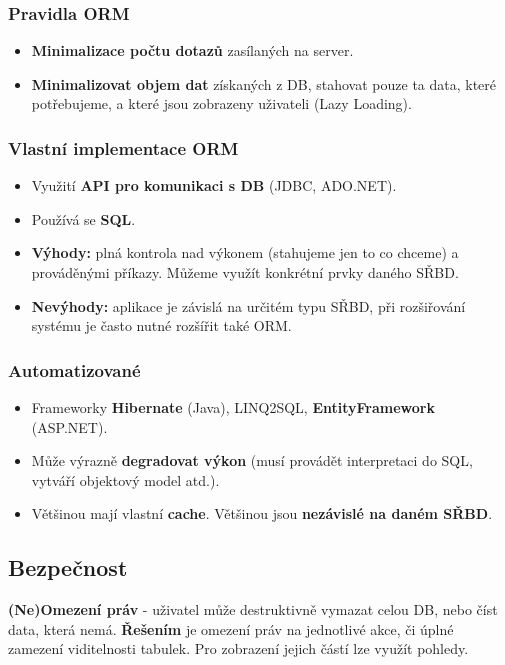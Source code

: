 \subsubsection{Pravidla ORM}
\begin{itemize}
\item \textbf{Minimalizace počtu dotazů }zasílaných na server.
\item \textbf{Minimalizovat objem dat} získaných z DB, stahovat pouze ta data, které potřebujeme, a které jsou zobrazeny uživateli (Lazy Loading).
\end{itemize}

\subsubsection{Vlastní implementace ORM}
\begin{itemize}
\item Využití \textbf{API pro komunikaci s DB} (JDBC, ADO.NET).
\item Používá se \textbf{SQL}.
\item \textbf{Výhody:} plná kontrola nad výkonem (stahujeme jen to co chceme) a prováděnými příkazy. Můžeme využít konkrétní prvky daného SŘBD.
\item \textbf{Nevýhody:} aplikace je závislá na určitém typu SŘBD, při rozšiřování systému je často nutné rozšířit také ORM.
\end{itemize}

\subsubsection{Automatizované}
\begin{itemize}
\item Frameworky \textbf{Hibernate} (Java), LINQ2SQL, \textbf{EntityFramework} (ASP.NET).
\item Může výrazně \textbf{degradovat výkon} (musí provádět interpretaci do SQL, vytváří objektový model atd.).
\item Většinou mají vlastní \textbf{cache}. Většinou jsou \textbf{nezávislé na daném SŘBD}.
\end{itemize}

\subsection{Bezpečnost}
\textbf{(Ne)Omezení práv} - uživatel může destruktivně vymazat celou DB, nebo číst data, která nemá. \textbf{Řešením} je omezení práv na jednotlivé akce, či úplné zamezení viditelnosti tabulek. Pro zobrazení jejich částí lze využít pohledy. 

